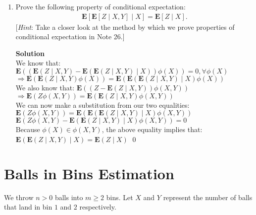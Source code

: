 \documentclass[11pt]{article}
\newcommand*{\Question}[1]{\section{#1}}
\newenvironment{Parts}{\begin{enumerate}[label=(\alph*)]}{\end{enumerate}}
\newcommand*{\Part}{\item}
\newenvironment{Answer}{\vspace{10pt}\begin{mdframed}\textbf{Solution}\\}{\end{mdframed}\vfill\pagebreak[3]}
\newenvironment{Answer}{\vspace{10pt}}{\vfill\pagebreak[3]}
\newcommand*{\E}{\textbf{E}}
\begin{document}
\begin{Parts}
  \Part Prove the following property of conditional expectation:
  \begin{align*}
      \E[ \E[Z \mid X, Y] \mid X ] = \E[Z \mid X].
  \end{align*}
  [\textit{Hint}: Take a closer look at the method by which we prove properties of conditional expectation in Note 26.]
  \begin{Answer}
We know that: $\E((\E(Z \mid X,Y)-\E(\E(Z \mid X,Y) \mid X))\phi(X))=0, \forall \phi(X)$\\
$\Rightarrow \E(\E(Z \mid X,Y)\phi(X))=\E(\E(\E(Z \mid X,Y) \mid X)\phi(X))$\\
We also know that: $\E((Z-\E(Z \mid X,Y))\phi(X,Y))$\\
$\Rightarrow \E(Z\phi(X,Y))=\E(\E(Z \mid X,Y)\phi(X,Y))$\\
We can now make a substitution from our two equalities: \\
$\E(Z\phi(X,Y))=\E(\E(\E(Z \mid X,Y) \mid X)\phi(X,Y))$\\
$\E(Z\phi(X,Y)-\E(\E(Z\mid X,Y) \mid X)\phi(X,Y))=0$\\
Because $\phi(X) \in \phi(X,Y)$, the above equality implies that:\\
$\E(\E(Z \mid X,Y)\mid X)=\E(Z \mid X)$ \qed

  \end{Answer}
\end{Parts}


\Question{Balls in Bins Estimation}

We throw $n > 0$ balls into $m \geq 2$ bins. Let $X$ and $Y$ represent the number of balls that land in bin $1$ and $2$ respectively.
\end{document}
